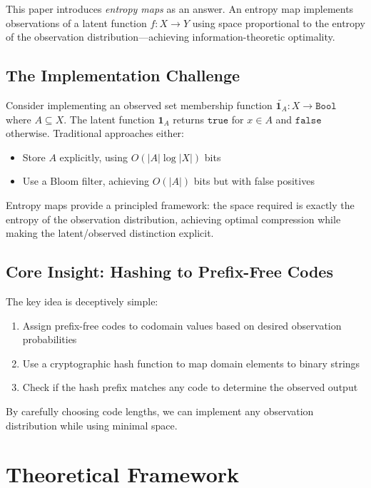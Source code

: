 \documentclass[11pt,final,hidelinks]{article}
\newcommand{\obs}[1]{\widetilde{#1}}  %
\newcommand{\Indicator}[1]{\mathbf{1}_{#1}}
\newcommand{\Card}[1]{\lvert#1\rvert}
\newcommand{\Type}[1]{\mathtt{#1}}
\newcommand{\Bool}{\Type{Bool}}
\newcommand{\True}{\mathtt{true}}
\newcommand{\False}{\mathtt{false}}
\begin{document}
This paper introduces \emph{entropy maps} as an answer. An entropy map implements observations of a latent function $f: X \to Y$ using space proportional to the entropy of the observation distribution—achieving information-theoretic optimality.

\subsection{The Implementation Challenge}

Consider implementing an observed set membership function $\obs{\Indicator{A}}: X \to \Bool$ where $A \subseteq X$. The latent function $\Indicator{A}$ returns $\True$ for $x \in A$ and $\False$ otherwise. Traditional approaches either:
\begin{itemize}
    \item Store $A$ explicitly, using $O(\Card{A} \log \Card{X})$ bits
    \item Use a Bloom filter, achieving $O(\Card{A})$ bits but with false positives
\end{itemize}

Entropy maps provide a principled framework: the space required is exactly the entropy of the observation distribution, achieving optimal compression while making the latent/observed distinction explicit.

\subsection{Core Insight: Hashing to Prefix-Free Codes}

The key idea is deceptively simple:
\begin{enumerate}
    \item Assign prefix-free codes to codomain values based on desired observation probabilities
    \item Use a cryptographic hash function to map domain elements to binary strings
    \item Check if the hash prefix matches any code to determine the observed output
\end{enumerate}

By carefully choosing code lengths, we can implement any observation distribution while using minimal space.

\section{Theoretical Framework}
\end{document}

